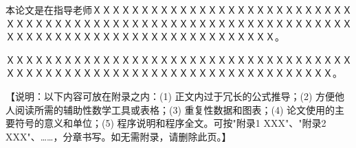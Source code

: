 \documentclass[a4paper]{ltxdoc}
\begin{document}
	{
		\clearpage %
		\nocite{*} %
	}
	
	\begin{acknowledge}
		本论文是在指导老师ＸＸＸＸＸＸＸＸＸＸＸＸＸＸＸＸＸＸＸＸＸＸＸＸＸＸＸＸＸＸＸＸＸＸＸＸＸＸＸＸＸＸＸＸＸＸＸＸＸＸＸＸＸＸＸＸＸＸＸＸＸＸＸＸＸＸＸＸＸＸＸＸＸＸＸＸＸＸＸＸＸＸＸＸＸＸＸＸＸＸＸ。
		
		ＸＸＸＸＸＸＸＸＸＸＸＸＸＸＸＸＸＸＸＸＸＸＸＸＸＸＸＸＸＸＸＸＸＸＸＸＸＸＸＸＸＸＸＸＸＸＸＸＸＸＸＸＸＸＸＸＸＸＸＸＸＸＸＸＸＸＸＸＸＸ。
	\end{acknowledge}
	
	\begin{appendix}
		【说明：以下内容可放在附录之内：(1) 正文内过于冗长的公式推导；(2) 方便他人阅读所需的辅助性数学工具或表格；(3) 重复性数据和图表；(4) 论文使用的主要符号的意义和单位；(5) 程序说明和程序全文。可按"附录1  XXX"、"附录2  XXX"、……，分章书写。如无需附录，请删除此页。】
	\end{appendix}
	
\end{document}
